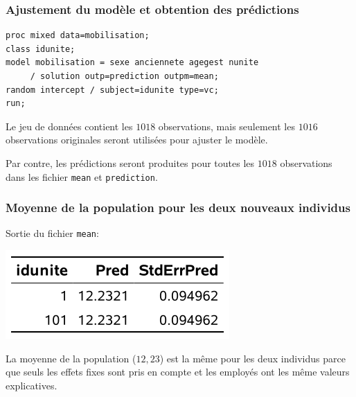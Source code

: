 \documentclass{beamer}
\begin{document}
\begin{frame}[fragile]
\frametitle{Ajustement du modèle et obtention des prédictions}
\begin{tcolorbox}[colback=white, colframe=hecblue, title=Code \SASlang pour obtenir des prédictions du modèle mixte]
\begin{verbatim}
proc mixed data=mobilisation;
class idunite;
model mobilisation = sexe anciennete agegest nunite
     / solution outp=prediction outpm=mean;
random intercept / subject=idunite type=vc;
run;
\end{verbatim}
\end{tcolorbox}
\bi
\item  Le jeu de données  contient les $1018$ observations, mais seulement les $1016$ observations originales seront utilisées pour ajuster le modèle.
\item Par contre, les prédictions seront produites pour toutes les $1018$ observations dans les fichier \texttt{mean} et \texttt{prediction}.
\ei
\end{frame}

\begin{frame}[fragile]
\frametitle{Moyenne de la population pour les deux nouveaux individus}
Sortie du fichier \texttt{mean}:
\begin{center}
\includegraphics[width = 0.4\linewidth]{img/c6/diapos7-e21}
\end{center}
\bi
\item La moyenne de la population ($12,23$) est la même pour les deux individus parce que seuls les effets fixes sont pris en compte et les employés ont les même valeurs explicatives.
\ei
\end{frame}
\end{document}
